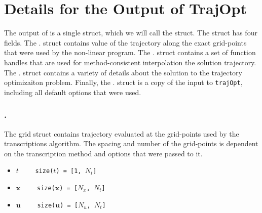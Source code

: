 \section{Details for the Output of TrajOpt}
The output of  is a single struct, which we will call the  struct. The  struct has four fields. The . struct contains value of the trajectory along the exact grid-points that were used by the non-linear program.  The . struct contains a set of function handles that are used for method-consistent interpolation the solution trajectory. The . struct contains a variety of details about the solution to the trajectory optimizaiton problem. Finally, the . struct is a copy of the input to \texttt{trajOpt}, including all default options that were used.


\subsubsection*{.}
The grid struct contains trajectory evaluated at the grid-points used by the transcriptions algorithm. The spacing and number of the grid-points is dependent on the transcription method and options that were passed to it.
\begin{itemize} \setlength\itemsep{-0.1em}
\item {}\tc{ = }$t \qquad$ \texttt{size($t$) = [1, $N_t$]}   
\item {}\tc{ = }$\bm{x} \qquad$ \texttt{size($\bm{x}$) = [$N_x$, $N_t$]}  
\item {}\tc{ = }$\bm{u} \qquad$ \texttt{size($\bm{u}$) = [$N_u$, $N_t$]}
\end{itemize}


